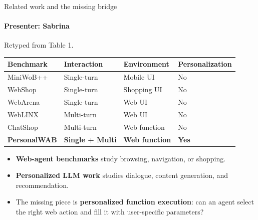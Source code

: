 \documentclass[10pt]{beamer}
\renewcommand{\arraystretch}{1.12}
\newcommand{\keypoint}[1]{\textcolor{uOttawaPrimary}{\textbf{#1}}}
\newcommand{\speaker}[1]{\framesubtitle{Presenter: #1}}
\begin{document}
\begin{frame}{Related work and the missing bridge}
  \speaker{Sabrina}
  {\scriptsize Retyped from Table 1.\par}
  \vspace{0.35em}

  {\footnotesize
  \renewcommand{\arraystretch}{1.15}
  \begin{tabularx}{\textwidth}{@{}>{\raggedright\arraybackslash}X>{\centering\arraybackslash}p{}>{\centering\arraybackslash}p{}>{\centering\arraybackslash}p{}@{}}
    \toprule
    Benchmark & Interaction & Environment & Personalization \\
    \midrule
    MiniWoB++ & Single-turn & Mobile UI & No \\
    WebShop & Single-turn & Shopping UI & No \\
    WebArena & Single-turn & Web UI & No \\
    WebLINX & Multi-turn & Web UI & No \\
    ChatShop & Multi-turn & Web function & No \\
    \textbf{PersonalWAB} & \textbf{Single + Multi} & \textbf{Web function} & \textbf{Yes} \\
    \bottomrule
  \end{tabularx}\par}

  \vspace{0.5em}
  \small
  \begin{itemize}
    \item \keypoint{Web-agent benchmarks} study browsing, navigation, or shopping.
    \item \keypoint{Personalized LLM work} studies dialogue, content generation, and recommendation.
    \item The missing piece is \textbf{personalized function execution}: can an agent select the right web action and fill it with user-specific parameters?
  \end{itemize}
\end{frame}
\end{document}
